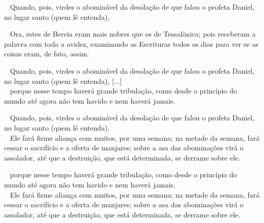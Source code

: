 \documentclass[12pt,aspectratio=169]{beamer}
\newcommand{\ver}[1]{%
    \raisebox{0.50ex}{%
        \scalebox{1.1}{%
            \pmb{\textbf{\textcolor{BSpbg}{#1}}}%
        }%
    }%
}
\newcommand{\QUOTE}[1]{%
    \par\noindent\hspace*{0.1\linewidth}%
    \begin{minipage}{0.8\linewidth}%
        \linespread{1.35}\large{#1}%
    \end{minipage}%
}
\newcommand{\RED}[1]{{\textcolor{TXred}{#1}}}
\newcommand{\YEL}[1]{{\textcolor{TXyel}{#1}}}
\newcommand{\GRE}[1]{{\textcolor{TXgre}{#1}}}
\newcommand{\MAG}[1]{{\textcolor{TXmag}{#1}}}
\begin{document}
    \begin{frame}
        \QUOTE{%
            \ver{(ARA) Mt~24.15}~%
            \YEL{Quando}, pois, virdes \GRE{o  abominável  da  desolação}  de  que  falou  o
            \MAG{profeta Daniel}, no lugar santo (quem lê entenda),
        }
    \end{frame}

    \begin{frame}
        \QUOTE{%
            \ver{(ARA) At~17.11}~%
            Ora, estes de \YEL{Bereia} eram \GRE{mais nobres} que os  de  Tessalônica;  pois
            receberam a palavra com toda a avidez, \MAG{examinando as  Escrituras  todos  os
            dias para ver se as coisas eram, de fato, assim}.
        }
    \end{frame}

    \begin{frame}
        \QUOTE{%
            \ver{(ARA) Mt~24.15}~%
            \YEL{Quando}, pois, virdes \GRE{o  abominável  da  desolação}  de  que  falou  o
            \MAG{profeta Daniel}, no lugar santo (quem lê entenda), [...] \\[\bigskipamount]
            \ver{(ARA) Mt~24.21}~%
            porque \YEL{nesse tempo} haverá \RED{grande tribulação}, como desde o  princípio
            do mundo até agora não tem havido e nem haverá jamais.
        }
    \end{frame}

    \begin{frame}
        \QUOTE{%
            \ver{(ARA) Mt~24.15}~%
            \YEL{Quando}, pois, virdes \GRE{o  abominável  da  desolação}  de  que  falou  o
            \MAG{profeta Daniel}, no lugar santo (quem lê entenda), \\[\bigskipamount]
            \ver{(ARA) Dn~9.27}~%
            Ele fará firme aliança com muitos, por uma semana; \YEL{na  metade  da  semana},
            fará cessar  o  sacrifício  e  a  oferta  de  manjares;  sobre  a  \GRE{asa  das
            abominações virá o assolador}, até que a destruição, que  está  determinada,  se
            derrame sobre ele.
        }
    \end{frame}

    \begin{frame}
        \QUOTE{%
            \ver{(ARA) Mt~24.21}~%
            porque \YEL{nesse tempo} haverá \RED{grande tribulação}, como desde o  princípio
            do mundo até agora não tem havido e nem haverá jamais. \\[\bigskipamount]
            \ver{(ARA) Dn~9.27}~%
            Ele fará firme aliança com muitos, por uma semana; \YEL{na  metade  da  semana},
            fará cessar  o  sacrifício  e  a  oferta  de  manjares;  sobre  a  \GRE{asa  das
            abominações virá o assolador}, até que a destruição, que  está  determinada,  se
            derrame sobre ele.
        }
    \end{frame}
\end{document}
